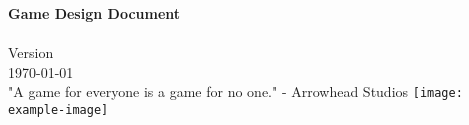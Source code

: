 \begin{titlepage}
    \centering
    {\Huge\bfseries\textcolor{\maincolor}{Game Design Document}}\\[2em]
    {\Large \Workingtitle}\\[4em]
    {\Large Version \version}\\[1em]
    {\large \today}\\[12em]
    {\Large "A game for everyone is a game for no one." - Arrowhead Studios}
    \vfill
    {\texttt{[image: example-image]}}\\[4em]
    {\large \teamname}
\end{titlepage}